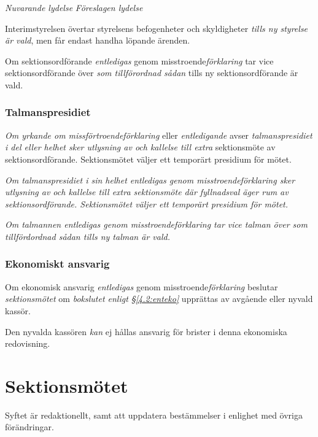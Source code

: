 \documentclass{article}
\newenvironment{lydelse}
    {\begin{paracol}{2}%
        \emph{Nuvarande lydelse}%
        \switchcolumn%
        \emph{Föreslagen lydelse}%
    \end{paracol}%
    \begin{enumerate}[label=\thesubsection.\arabic*]%
    \begin{paracol}{2}%
    }{\end{paracol}\end{enumerate}}
\begin{document}
\begin{lydelse}
    \item Interimstyrelsen övertar styrelsens befogenheter och skyldigheter
      \emph{tills ny styrelse är vald}, men får endast handha löpande ärenden.

    \item Om sektionsordförande \emph{entledigas} genom
      misstroende\emph{förklaring} tar vice sektionsordförande över \emph{som
      tillförordnad sådan} tills ny sektionsordförande är vald.

    \subsubsection*{Talmanspresidiet}
    \item \emph{Om yrkande om missförtroendeförklaring} eller
      \emph{entledigande} avser \emph{talmanspresidiet i del eller helhet sker
      utlysning av och kallelse till extra} sektionsmöte av sektionsordförande.
      Sektionsmötet väljer ett temporärt presidium för mötet.

    \item \emph{Om talmanspresidiet i sin helhet entledigas genom
        misstroendeförklaring sker utlysning av och kallelse till extra
        sektionsmöte där fyllnadsval äger rum av sektionsordförande.
        Sektionsmötet väljer ett temporärt presidium för mötet.}

    \item \emph{Om talmannen entledigas genom misstroendeförklaring tar vice
        talman över som tillfördordnad sådan tills ny talman är vald.}
      
    \subsubsection*{Ekonomiskt ansvarig}
    \item Om ekonomisk ansvarig \emph{entledigas} genom
      misstroende\emph{förklaring} beslutar \emph{sektionsmötet} om \emph{bokslutet
      enligt \S\ref{4.2:enteko}} upprättas av avgående eller nyvald kassör.

    \item Den nyvalda kassören \emph{kan} ej hållas ansvarig för brister i denna
      ekonomiska redovisning.

\end{lydelse}

\section{Sektionsmötet}
Syftet är redaktionellt, samt att uppdatera bestämmelser i enlighet med övriga
förändringar.
\end{document}

